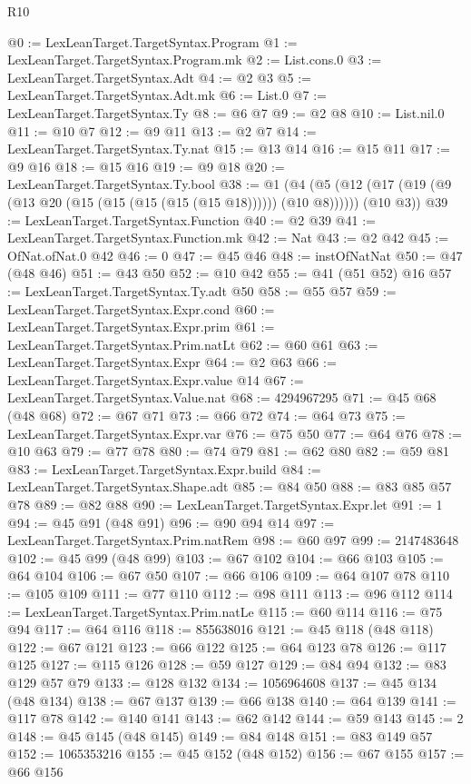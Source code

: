 \begin{lexlean}{R10}
\begin{coremodule}
@0 := LexLeanTarget.TargetSyntax.Program
@1 := LexLeanTarget.TargetSyntax.Program.mk
@2 := List.cons.{0}
@3 := LexLeanTarget.TargetSyntax.Adt
@4 := @2 @3
@5 := LexLeanTarget.TargetSyntax.Adt.mk
@6 := List.{0}
@7 := LexLeanTarget.TargetSyntax.Ty
@8 := @6 @7
@9 := @2 @8
@10 := List.nil.{0}
@11 := @10 @7
@12 := @9 @11
@13 := @2 @7
@14 := LexLeanTarget.TargetSyntax.Ty.nat
@15 := @13 @14
@16 := @15 @11
@17 := @9 @16
@18 := @15 @16
@19 := @9 @18
@20 := LexLeanTarget.TargetSyntax.Ty.bool
@38 := @1
    (@4 (@5 (@12 (@17 (@19 (@9 (@13 @20 (@15 (@15 (@15 (@15 (@15 @18)))))) (@10 @8)))))) (@10 @3))
@39 := LexLeanTarget.TargetSyntax.Function
@40 := @2 @39
@41 := LexLeanTarget.TargetSyntax.Function.mk
@42 := Nat
@43 := @2 @42
@45 := OfNat.ofNat.{0} @42
@46 := 0
@47 := @45 @46
@48 := instOfNatNat
@50 := @47 (@48 @46)
@51 := @43 @50
@52 := @10 @42
@55 := @41 (@51 @52) @16
@57 := LexLeanTarget.TargetSyntax.Ty.adt @50
@58 := @55 @57
@59 := LexLeanTarget.TargetSyntax.Expr.cond
@60 := LexLeanTarget.TargetSyntax.Expr.prim
@61 := LexLeanTarget.TargetSyntax.Prim.natLt
@62 := @60 @61
@63 := LexLeanTarget.TargetSyntax.Expr
@64 := @2 @63
@66 := LexLeanTarget.TargetSyntax.Expr.value @14
@67 := LexLeanTarget.TargetSyntax.Value.nat
@68 := 4294967295
@71 := @45 @68 (@48 @68)
@72 := @67 @71
@73 := @66 @72
@74 := @64 @73
@75 := LexLeanTarget.TargetSyntax.Expr.var
@76 := @75 @50
@77 := @64 @76
@78 := @10 @63
@79 := @77 @78
@80 := @74 @79
@81 := @62 @80
@82 := @59 @81
@83 := LexLeanTarget.TargetSyntax.Expr.build
@84 := LexLeanTarget.TargetSyntax.Shape.adt
@85 := @84 @50
@88 := @83 @85 @57 @78
@89 := @82 @88
@90 := LexLeanTarget.TargetSyntax.Expr.let
@91 := 1
@94 := @45 @91 (@48 @91)
@96 := @90 @94 @14
@97 := LexLeanTarget.TargetSyntax.Prim.natRem
@98 := @60 @97
@99 := 2147483648
@102 := @45 @99 (@48 @99)
@103 := @67 @102
@104 := @66 @103
@105 := @64 @104
@106 := @67 @50
@107 := @66 @106
@109 := @64 @107 @78
@110 := @105 @109
@111 := @77 @110
@112 := @98 @111
@113 := @96 @112
@114 := LexLeanTarget.TargetSyntax.Prim.natLe
@115 := @60 @114
@116 := @75 @94
@117 := @64 @116
@118 := 855638016
@121 := @45 @118 (@48 @118)
@122 := @67 @121
@123 := @66 @122
@125 := @64 @123 @78
@126 := @117 @125
@127 := @115 @126
@128 := @59 @127
@129 := @84 @94
@132 := @83 @129 @57 @79
@133 := @128 @132
@134 := 1056964608
@137 := @45 @134 (@48 @134)
@138 := @67 @137
@139 := @66 @138
@140 := @64 @139
@141 := @117 @78
@142 := @140 @141
@143 := @62 @142
@144 := @59 @143
@145 := 2
@148 := @45 @145 (@48 @145)
@149 := @84 @148
@151 := @83 @149 @57
@152 := 1065353216
@155 := @45 @152 (@48 @152)
@156 := @67 @155
@157 := @66 @156

\end{coremodule}
\end{lexlean}
